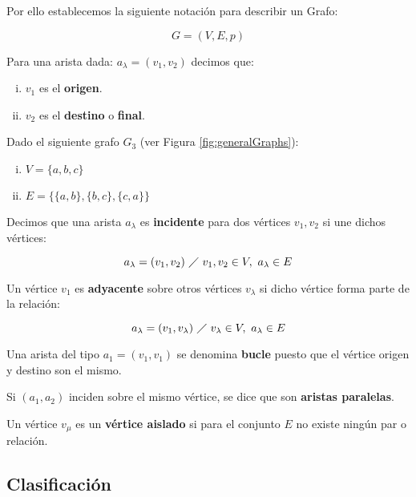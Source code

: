 Por ello establecemos la siguiente notación para describir un Grafo:

\begin{equation}
G = (V,E,p)
\end{equation}

 Para una arista dada: $a_\lambda = (v_1, v_2)$ decimos que:
{
\begin{enumerate}[i.]

\item $v_1$ es el \textbf{origen}.

\item $v_2$ es el \textbf{destino} o \textbf{final}.

\end{enumerate}
}

\ejem Dado el siguiente grafo $G_3$ (ver Figura \ref{fig:generalGraphs}):

\begin{enumerate}[i.]
\item $V = \{a,b,c\}$
\item $E = \{\{a,b\},\{b,c\},\{c,a\}\}$
\end{enumerate}

 Decimos que una arista $a_{\lambda}$ es \textbf{incidente} para dos 
vértices $v_1, v_2$ si une dichos vértices:

\begin{equation}
a_{\lambda} = (v_1, v_2)\ \diagup\ v_1, v_2 \in V,\ a_{\lambda} \in E
\end{equation}

 Un vértice $v_1$ es \textbf{adyacente} sobre otros vértices $v_{\lambda}$ 
si dicho vértice forma parte de la relación:

\begin{equation}
a_{\lambda} = (v_1, v_{\lambda})\ \diagup\ v_{\lambda} \in V,\ a_{\lambda} \in E
\end{equation}


 Una arista del tipo $a_1 = (v_1, v_1)$ se denomina \textbf{bucle} puesto 
que el vértice origen y destino son el mismo.

 Si $(a_1, a_2)$ inciden sobre el mismo vértice, se dice que son 
\textbf{aristas paralelas}.


 Un vértice $v_\mu$ es un \textbf{vértice aislado} si para el 
conjunto $E$ no existe ningún par o relación.



\subsection{Clasificación}
\label{sec:clasificacionGrafos}

